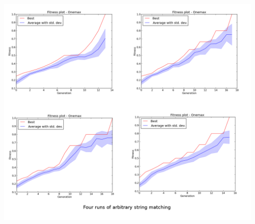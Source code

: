 \documentclass[a4paper,12pt]{article}
\begin{document}

\centerline{\includegraphics[width=1.2\textwidth]{graph_bundle_3}}
\end{document}
